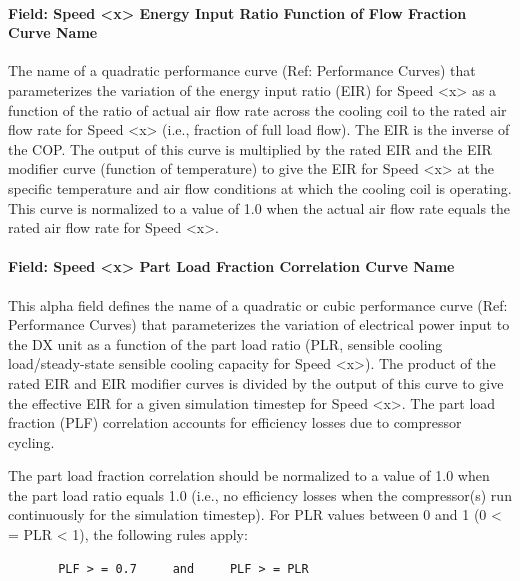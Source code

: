 \paragraph{Field: Speed \textless{}x\textgreater{} Energy Input Ratio Function of Flow Fraction Curve Name}\label{field-speed-x-energy-input-ratio-function-of-flow-fraction-curve-name}

The name of a quadratic performance curve (Ref: Performance Curves) that parameterizes the variation of the energy input ratio (EIR) for Speed \textless{}x\textgreater{} as a function of the ratio of actual air flow rate across the cooling coil to the rated air flow rate for Speed \textless{}x\textgreater{} (i.e., fraction of full load flow). The EIR is the inverse of the COP. The output of this curve is multiplied by the rated EIR and the EIR modifier curve (function of temperature) to give the EIR for Speed \textless{}x\textgreater{} at the specific temperature and air flow conditions at which the cooling coil is operating. This curve is normalized to a value of 1.0 when the actual air flow rate equals the rated air flow rate for Speed \textless{}x\textgreater{}.

\paragraph{Field: Speed \textless{}x\textgreater{} Part Load Fraction Correlation Curve Name}\label{field-speed-x-part-load-fraction-correlation-curve-name}

This alpha field defines the name of a quadratic or cubic performance curve (Ref: Performance Curves) that parameterizes the variation of electrical power input to the DX unit as a function of the part load ratio (PLR, sensible cooling load/steady-state sensible cooling capacity for Speed \textless{}x\textgreater{}). The product of the rated EIR and EIR modifier curves is divided by the output of this curve to give the effective EIR for a given simulation timestep for Speed \textless{}x\textgreater{}. The part load fraction (PLF) correlation accounts for efficiency losses due to compressor cycling.

The part load fraction correlation should be normalized to a value of 1.0 when the part load ratio equals 1.0 (i.e., no efficiency losses when the compressor(s) run continuously for the simulation timestep). For PLR values between 0 and 1 (0 \textless{} = PLR \textless{} 1), the following rules apply:

\begin{lstlisting}
       PLF > = 0.7     and     PLF > = PLR
\end{lstlisting}

